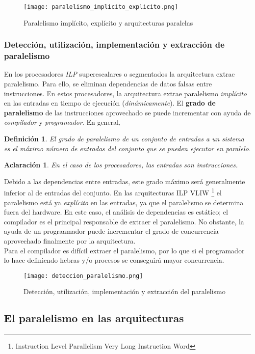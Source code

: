 \documentclass[12pt,spanish]{article}
\newtheorem*{definition}{Definición}
\newtheorem*{aclaration}{Aclaración}
\begin{document}
\begin{figure}[H]
\centering
\texttt{[image: paralelismo\_implicito\_explicito.png]}
\caption{Paralelismo implícito, explícito y arquitecturas paralelas}
\end{figure}

\subsubsection{Detección, utilización, implementación y extracción de paralelismo}

En los procesadores \textit{ILP} superescalares o segmentados la arquitectura extrae paralelismo. Para ello, se eliminan dependencias de datos falsas entre instrucciones. En estos procesadores, la arquitectura extrae paralelismo \emph{implícito} en las entradas en tiempo de ejecución (\textit{dinámicamente}). El \textbf{grado de paralelismo} de las instrucciones aprovechado se puede incrementar con ayuda de \emph{compilador} y \emph{programador}. En general,\begin{definition}
El grado de paralelismo de un conjunto de entradas a un sistema es el máximo número de entradas del conjunto que se pueden ejecutar en paralelo.
\end{definition}
\begin{aclaration}
En el caso de los procesadores, las entradas son instrucciones.
\end{aclaration}
Debido a las dependencias entre entradas, este grado máximo será generalmente inferior al de entradas del conjunto. En las arquitecturas ILP VLIW \footnote{Instruction Level Parallelism Very Long Instruction Word} el paralelismo está ya \emph{explícito} en las entradas, ya que el paralelismo se determina fuera del hardware. En este caso, el análisis de dependencias es estático; el compilador es el principal responsable de extraer el paralelismo. No obstante, la ayuda de un prograamador puede incrementar el grado de concurrencia aprovechado finalmente por la arquitectura.\\
Para el compilador es difícil extraer el paralelismo, por lo que si el programador lo hace definiendo hebras y/o procesos se conseguirá mayor concurrencia.
\begin{figure}[H]
\centering
\texttt{[image: deteccion\_paralelismo.png]}
\caption{Detección, utilización, implementación y extracción del paralelismo}
\end{figure}
\subsection{El paralelismo en las arquitecturas}
\end{document}
